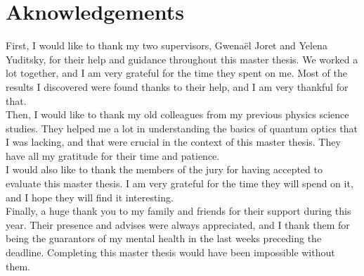 \setcounter{secnumdepth}{-1}

\chapter{Aknowledgements}
\label{ch:aknowledgements}

First, I would like to thank my two supervisors, Gwenaël Joret and Yelena Yuditsky, for their help and guidance throughout this master thesis.
We worked a lot together, and I am very grateful for the time they spent on me.
Most of the results I discovered were found thanks to their help, and I am very thankful for that.\\

Then, I would like to thank my old colleagues from my previous physics science studies.
They helped me a lot in understanding the basics of quantum optics that I was lacking, and that were crucial in the context of this master thesis.
They have all my gratitude for their time and patience.\\

I would also like to thank the members of the jury for having accepted to evaluate this master thesis.
I am very grateful for the time they will spend on it, and I hope they will find it interesting.\\

Finally, a huge thank you to my family and friends for their support during this year.
Their presence and advises were always appreciated, and I thank them for being the guarantors of my mental health in the last weeks preceding the deadline.
Completing this master thesis would have been impossible without them.\\
